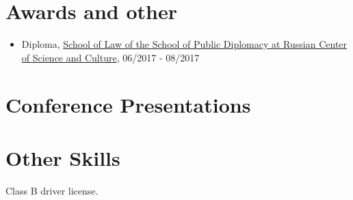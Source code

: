 \documentclass{article}
\begin{document}
\section{Awards and other}
\begin{itemize}
\item Diploma, \href{http://www.schoolofpublicdiplomacy.com/}{School of Law of the School of Public Diplomacy at Russian Center of Science and Culture},  06/2017 - 08/2017 
\end{itemize}
 
\section{Conference Presentations }
 
 
\section{Other Skills}
\begin{description}[widest=Langauges]
\item[Other]  Class B driver license.
\end{description}
\end{document}
